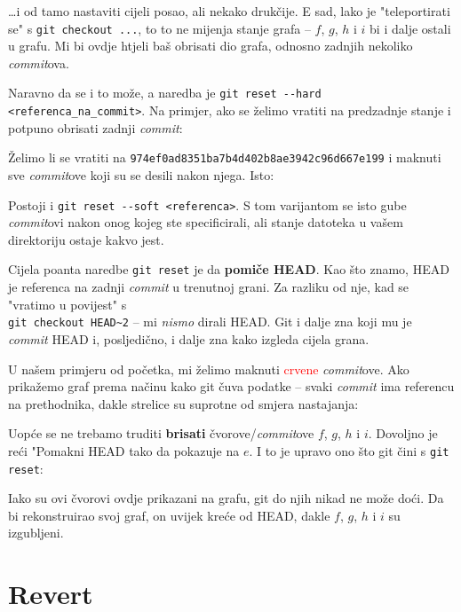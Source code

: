 

\dots{}i od tamo nastaviti cijeli posao, ali nekako drukčije.
E sad, lako je "teleportirati se" s \verb+git checkout ...+, to to ne mijenja stanje grafa -- $f$, $g$, $h$ i $i$ bi i dalje ostali u grafu.
Mi bi ovdje htjeli baš obrisati dio grafa, odnosno zadnjih nekoliko \emph{commit}ova.

Naravno da se i to može, a naredba je \verb+git reset --hard <referenca_na_commit>+.
Na primjer, ako se želimo vratiti na predzadnje stanje i potpuno obrisati zadnji \emph{commit}:


Želimo li se vratiti na \verb+974ef0ad8351ba7b4d402b8ae3942c96d667e199+ i maknuti sve \emph{commit}ove koji su se desili nakon njega.
Isto:


Postoji i \verb+git reset --soft <referenca>+. 
S tom varijantom se isto gube \emph{commit}ovi nakon onog kojeg ste specificirali, ali stanje datoteka u vašem direktoriju ostaje kakvo jest.

Cijela poanta naredbe \verb+git reset+ je da \textbf{pomiče HEAD}.
Kao što znamo, HEAD je referenca na zadnji \emph{commit} u trenutnoj grani.
Za razliku od nje, kad se "vratimo u povijest" s \\ \verb+git checkout HEAD~2+ -- mi \emph{nismo} dirali HEAD.
Git i dalje zna koji mu je \emph{commit} HEAD i, posljedično, i dalje zna kako izgleda cijela grana.

U našem primjeru od početka, mi želimo maknuti \textcolor{red}{crvene} \emph{commit}ove. 
Ako prikažemo graf prema načinu kako git čuva podatke -- svaki \emph{commit} ima referencu na prethodnika, dakle strelice su suprotne od smjera nastajanja:



Uopće se ne trebamo truditi \textbf{brisati} čvorove/\emph{commit}ove $f$, $g$, $h$ i $i$.
Dovoljno je reći "Pomakni HEAD tako da pokazuje na $e$.
I to je upravo ono što git čini s \verb+git reset+:



Iako su ovi čvorovi ovdje prikazani na grafu, git do njih nikad ne može doći.
Da bi rekonstruirao svoj graf, on uvijek kreće od HEAD, dakle $f$, $g$, $h$ i $i$ su izgubljeni.

\section*{Revert}

